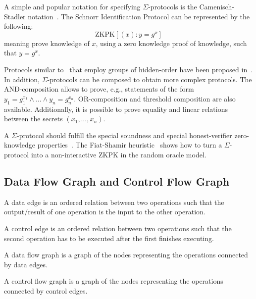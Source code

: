 A simple and popular notation for specifying $\Sigma$-protocols is the
Camenisch-Stadler notation~\cite{camenisch_stadler}. The Schnorr
Identification Protocol can be represented by the following:
\[
  \textrm{ZKPK}\left[ (x): y = g^x \right]
\]
meaning prove knowledge of $x$, using a zero knowledge proof of
knowledge, such that $y=g^x$.

Protocols similar to~\cite{schnorr_protocol} that employ groups of hidden-order have been proposed in~\cite{DBLP:conf/crypto/FujisakiO97,DBLP:journals/iacr/BangerterCKS008}. In addition, $\Sigma$-protocols can be composed to obtain more complex protocols. The AND-composition allows to prove, e.g., statements of the form $y_1 = g_1^{x_1} \land \ldots \land y_n = g_n^{x_n}$. OR-composition and threshold composition are also available. Additionally, it is possible to prove equality and linear relations between the secrets $(x_1,\ldots,x_n)$.

A $\Sigma$-protocol should fulfill the special soundness and special honest-verifier zero-knowledge properties~\cite{DamgardSigma2004}. The Fiat-Shamir heuristic~\cite{DBLP:conf/crypto/FiatS86} shows how to turn a $\Sigma$-protocol into a non-interactive ZKPK in the random oracle model.

\subsection{Data Flow Graph and Control Flow Graph}

\begin{defn}
  A data edge is an ordered relation between two operations such that
  the output/result of one operation is the input to the other
  operation.
\end{defn}

\begin{defn}
  A control edge is an ordered relation between two operations such
  that the second operation has to be executed after the first finishes
  executing.
\end{defn}

\begin{defn}
  A data flow graph is a graph of the nodes representing the
  operations connected by data edges.
\end{defn}

\begin{defn}
  A control flow graph is a graph of the nodes representing the
  operations connected by control edges.
\end{defn}

